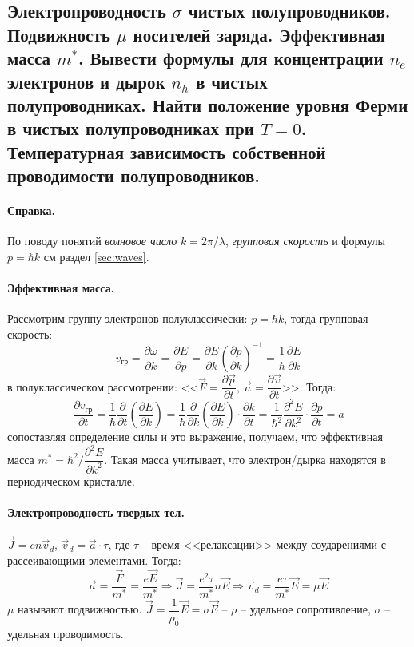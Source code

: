 \subsection{Электропроводность $\sigma$ чистых полупроводников. Подвижность $\mu$ носителей заряда.
Эффективная масса $m^*$. Вывести формулы для концентрации $n_e$ электронов и дырок $n_h$
в чистых полупроводниках. Найти положение уровня Ферми в чистых полупроводниках при $T=0$.
Температурная зависимость собственной проводимости полупроводников.}
\label{sec:w10}
{\footnotesize\paragraph{\footnotesize Справка.} По поводу понятий
  \emph{волновое число} $ k = 2\pi/\lambda $, \emph{групповая скорость} и формулы $ p = \hbar k
  $ см раздел \ref{sec:waves}.
}

\paragraph{Эффективная масса.} Рассмотрим группу электронов полуклассически: $p = \hbar k$, тогда
групповая скорость:
\[
  v_\text{гр} = \dfrac{\partial \omega}{\partial k} = \dfrac{\partial E}{\partial p} 
  = \dfrac{\partial E}{\partial k} \left( \dfrac{\partial p}{\partial k}  \right)^{-1}
  = \dfrac{1}{\hbar} \dfrac{\partial E}{\partial k} 
\]
в полуклассическом рассмотрении: <<$\vec{F} = \dfrac{\partial \vec{p}}{\partial
t},\
\vec{a} = \dfrac{\partial \vec{v}}{\partial t}$>>. Тогда:
\[
  \dfrac{\partial v_\text{гр}}{\partial t}
  = \dfrac{1}{\hbar} \dfrac{\partial }{\partial t} \left( \dfrac{\partial E}{\partial k} \right)
  = \dfrac{1}{\hbar} \dfrac{\partial }{\partial k} \left( \dfrac{\partial E}{\partial k}  \right) \cdot \dfrac{\partial k}{\partial t} 
  = \dfrac{1}{\hbar^2} \dfrac{\partial^2 E}{\partial k^2} \cdot \dfrac{\partial p}{\partial t}
  = a 
\]
сопоставляя определение силы и это выражение, получаем, что эффективная масса $m^* = \hbar^2 / \dfrac{\partial^2 E}{\partial k^2}$. Такая масса учитывает, что электрон/дырка
находятся в периодическом кристалле.

\paragraph{Электропроводность твердых тел.} $\vec{J} = en \vec{v}_d$, $\vec{v}_d = \vec{a} \cdot \tau$, где $\tau$ -- время <<релаксации>> между соударениями с рассеивающими элементами. Тогда:
\begin{equation}\label{write:10:v_d}
  \vec{a} = \dfrac{\vec{F}}{m^*} = \dfrac{e\vec{E}}{m^*}
  \Rightarrow
  \vec{J} = \dfrac{e^2 \tau}{m^*} n \vec{E}
  \Rightarrow
  \vec{v}_d = \dfrac{e \tau}{m^*} \vec{E} = \mu \vec{E}
\end{equation}
$\mu$ называют подвижностью. $\vec{J} = \dfrac{1}{\rho_0} \vec{E} = \sigma \vec{E}$ -- $\rho$ --
удельное сопротивление, $\sigma$ -- удельная проводимость.

